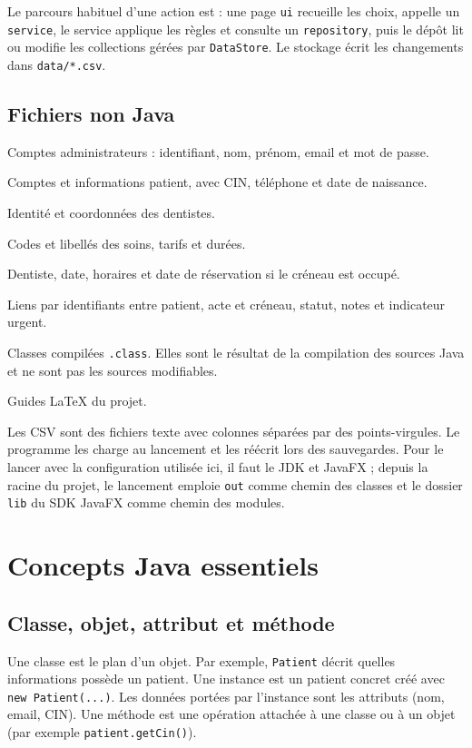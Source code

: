 \documentclass[11pt,a4paper]{report}
\begin{document}
Le parcours habituel d'une action est : une page \texttt{ui} recueille les choix, appelle un \texttt{service}, le service applique les règles et consulte un \texttt{repository}, puis le dépôt lit ou modifie les collections gérées par \texttt{DataStore}. Le stockage écrit les changements dans \texttt{data/*.csv}.

\section{Fichiers non Java}
\begin{description}[leftmargin=3.3cm,style=nextline]
\item[\texttt{data/administrateurs.csv}] Comptes administrateurs : identifiant, nom, prénom, email et mot de passe.
\item[\texttt{data/patients.csv}] Comptes et informations patient, avec CIN, téléphone et date de naissance.
\item[\texttt{data/dentistes.csv}] Identité et coordonnées des dentistes.
\item[\texttt{data/actes.csv}] Codes et libellés des soins, tarifs et durées.
\item[\texttt{data/creneaux.csv}] Dentiste, date, horaires et date de réservation si le créneau est occupé.
\item[\texttt{data/rendezvous.csv}] Liens par identifiants entre patient, acte et créneau, statut, notes et indicateur urgent.
\item[\texttt{out/}] Classes compilées \texttt{.class}. Elles sont le résultat de la compilation des sources Java et ne sont pas les sources modifiables.
\item[\texttt{documentation/}] Guides LaTeX du projet.
\end{description}

Les CSV sont des fichiers texte avec colonnes séparées par des points-virgules. Le programme les charge au lancement et les réécrit lors des sauvegardes. Pour le lancer avec la configuration utilisée ici, il faut le JDK et JavaFX ; depuis la racine du projet, le lancement emploie \texttt{out} comme chemin des classes et le dossier \texttt{lib} du SDK JavaFX comme chemin des modules.

\chapter{Concepts Java essentiels}
\section{Classe, objet, attribut et méthode}
Une classe est le plan d'un objet. Par exemple, \texttt{Patient} décrit quelles informations possède un patient. Une instance est un patient concret créé avec \texttt{new Patient(...)}. Les données portées par l'instance sont les attributs (nom, email, CIN). Une méthode est une opération attachée à une classe ou à un objet (par exemple \texttt{patient.getCin()}).
\end{document}
